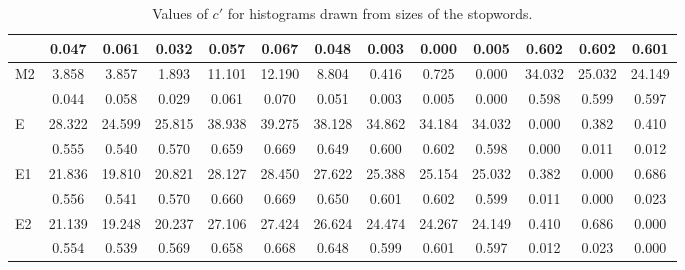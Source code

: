 \begin{table*}[h!]
\begin{center}
\begin{tabular}{| l | c | c | c | c | c | c | c | c | c | c | c | c |}
 & 0.047  & 0.061  & 0.032  & 0.057  & 0.067  & 0.048  & 0.003  & 0.000  & 0.005  & 0.602  & 0.602  & 0.601 \\\hline
M2 & 3.858  & 3.857  & 1.893  & 11.101  & 12.190  & 8.804  & 0.416  & 0.725  & 0.000  & 34.032  & 25.032  & 24.149 \\\hline
 & 0.044  & 0.058  & 0.029  & 0.061  & 0.070  & 0.051  & 0.003  & 0.005  & 0.000  & 0.598  & 0.599  & 0.597 \\\hline
E & 28.322  & 24.599  & 25.815  & 38.938  & 39.275  & 38.128  & 34.862  & 34.184  & 34.032  & 0.000  & 0.382  & 0.410 \\\hline
 & 0.555  & 0.540  & 0.570  & 0.659  & 0.669  & 0.649  & 0.600  & 0.602  & 0.598  & 0.000  & 0.011  & 0.012 \\\hline
E1 & 21.836  & 19.810  & 20.821  & 28.127  & 28.450  & 27.622  & 25.388  & 25.154  & 25.032  & 0.382  & 0.000  & 0.686 \\\hline
 & 0.556  & 0.541  & 0.570  & 0.660  & 0.669  & 0.650  & 0.601  & 0.602  & 0.599  & 0.011  & 0.000  & 0.023 \\\hline
E2 & 21.139  & 19.248  & 20.237  & 27.106  & 27.424  & 26.624  & 24.474  & 24.267  & 24.149  & 0.410  & 0.686  & 0.000 \\\hline
 & 0.554  & 0.539  & 0.569  & 0.658  & 0.668  & 0.648  & 0.599  & 0.601  & 0.597  & 0.012  & 0.023  & 0.000 \\\hline
\end{tabular}
\caption{Values of $c'$ for histograms drawn from sizes of the stopwords.}
\end{center}
\end{table*}